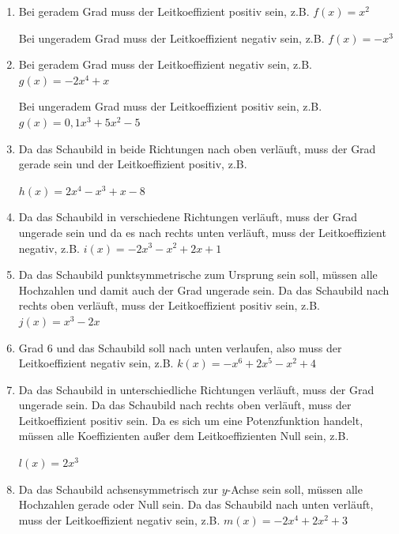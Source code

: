 \begin{Answer}[ref=ganzVerA2]
	
	\begin{minipage}{\textwidth}
		\begin{minipage}[t]{0.5\textwidth}
			\begin{enumerate}[label=\alph*)]
				\item Bei geradem Grad muss der Leitkoeffizient positiv sein, z.B. \(f(x)=x^2\)
				
				Bei ungeradem Grad muss der Leitkoeffizient negativ sein, z.B. \(f(x)=-x^3\)
				\item Bei geradem Grad muss der Leitkoeffizient negativ sein, z.B. \(g(x)=-2x^4+x\)
				
				Bei ungeradem Grad muss der Leitkoeffizient positiv sein, z.B. \(g(x)=0,1x^3+5x^2-5\)
				\item Da das Schaubild in beide Richtungen nach oben verläuft, muss der Grad gerade sein und der Leitkoeffizient positiv, z.B. 
				
				\(h(x)=2x^4-x^3+x-8\)
				\item Da das Schaubild in verschiedene Richtungen verläuft, muss der Grad ungerade sein und da es nach rechts unten verläuft, muss der Leitkoeffizient negativ, z.B. \(i(x)=-2x^3-x^2+2x+1\)
			\end{enumerate}
		\end{minipage}%
		\begin{minipage}[t]{0.5\textwidth}
			\begin{enumerate}[label=\alph*)]
				\setcounter{enumi}{4}
				\item Da das Schaubild punktsymmetrische zum Ursprung sein soll, müssen alle Hochzahlen und damit auch der Grad ungerade sein. Da das Schaubild nach rechts oben verläuft, muss der Leitkoeffizient positiv sein, z.B. \(j(x)=x^3-2x\)
				\item Grad 6 und das Schaubild soll nach unten verlaufen, also muss der Leitkoeffizient negativ sein, z.B. \(k(x)=-x^6+2x^5-x^2+4\)
				\item Da das Schaubild in unterschiedliche Richtungen verläuft, muss der Grad ungerade sein. Da das Schaubild nach rechts oben verläuft, muss der Leitkoeffizient positiv sein. Da es sich um eine Potenzfunktion handelt, müssen alle Koeffizienten außer dem Leitkoeffizienten Null sein, z.B. 
				
				\(l(x)=2x^3\)
				\item Da das Schaubild achsensymmetrisch zur \(y\)-Achse sein soll, müssen alle Hochzahlen gerade oder Null sein. Da das Schaubild nach unten verläuft, muss der Leitkoeffizient negativ sein, z.B. \(m(x)=-2x^4+2x^2+3\)
			\end{enumerate}
		\end{minipage}%
	\end{minipage}
\end{Answer}